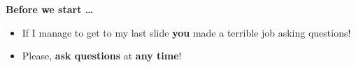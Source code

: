 \begin{frame}
    \textbf{Before we start \ldots}
    \begin{itemize}
        \item If I manage to get to my last slide \textbf{you} made a terrible job asking questions!
        \item Please, \textbf{ask questions} at \textbf{any time}!
    \end{itemize}
\end{frame}
